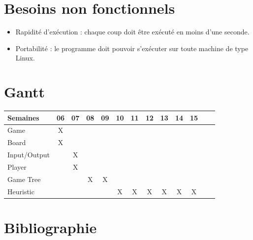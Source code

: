 \documentclass[10pt,a4paper]{article}
\begin{document}
\section{Besoins non fonctionnels}

\begin{itemize} 
\item Rapidité d'exécution : chaque coup doit être exécuté en moins d'une seconde.
\item Portabilité : le programme doit pouvoir s'exécuter sur toute machine de type Linux.
\end{itemize}

\section{Gantt}

\begin{center}
\begin{tabular}{| l | c | c | c | c | c | c | c | c | c | c | c | c |}
\hline
Semaines     & 06 & 07 & 08 & 09 & 10 & 11 & 12 & 13 & 14 & 15  \\ \hline
Game         & X  &    &    &    &    &    &    &    &    &     \\ \hline
Board        & X  &    &    &    &    &    &    &    &    &     \\ \hline
Input/Output &    & X  &    &    &    &    &    &    &    &     \\ \hline
Player       &    & X  &    &    &    &    &    &    &    &     \\ \hline
Game Tree    &    &    & X  & X  &    &    &    &    &    &     \\ \hline
Heuristic    &    &    &    &    &  X & X  & X  & X  & X  & X   \\ \hline
\end{tabular}
\end{center}
\newpage

\section{Bibliographie}


{}
\nocite{*}
\end{document}
